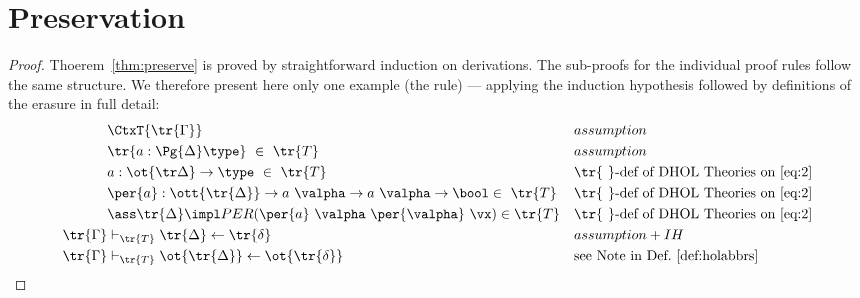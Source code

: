 \appendix\section{Preservation}\label{app:comp}
\begin{proof}
  Thoerem~\ref{thm:preserve} is proved by straightforward induction on derivations. The
  sub-proofs for the individual proof rules follow the same structure. We therefore present
  here only one example (the \Rtypesym rule) --- applying the induction hypothesis followed by definitions of the erasure in full detail:
  \begin{align}
    &\CtxT{\tr{\Gamma}} && assumption \label{eq:1}\\
    &\tr{a:\Pg{\Delta} \type}\ \in\ \tr{T} && assumption \label{eq:2}\\
    &a:\ot{\tr\Delta} \to\type\ \in\ \tr{T} && \tr{\phantom{t}}\text{-def of DHOL Theories on }
                                             \ref{eq:2} \label{eq:3}\\
    &\per{a}:\ott{\tr{\Delta}}\to a\ \valpha\to a\ \valpha\to \bool \in\ \tr{T} &&
                                                                                 \tr{\phantom{t}}\text{-def of DHOL Theories on }\ref{eq:2} \label{eq:4}\\
    &\ass \tr{\Delta}\impl PER(\per{a}\ \valpha\ \per{\valpha}\ \vx) \in \tr{T} &&
                                                                                   \tr{\phantom{t}}\text{-def of DHOL Theories on }\ref{eq:2} \label{eq:5}\\
    \tr{\Gamma} &\vdash_{\tr{T}} \tr{\Delta} \leftarrow \tr{\delta} && assumption +
                                                                       IH \label{eq:6}\\
    \tr{\Gamma} &\vdash_{\tr{T}} \ot{\tr{\Delta}} \leftarrow \ot{\tr{\delta}} && \text{see Note in
                                                                       Def.}~\ref{def:holabbrs}

\end{align}
\end{proof}
